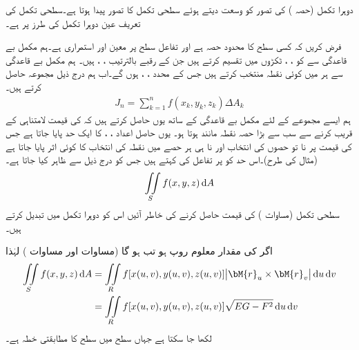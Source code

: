 دوہرا تکمل (حصہ ) کی تصور کو وسعت دیتے ہوئے سطحی تکمل کا تصور پیدا ہوتا ہے۔سطحی تکمل کی تعریف عین دوہرا تکمل کی طرز پر ہے۔

فرض کریں کہ  کسی سطح کا محدود حصہ ہے اور تفاعل  سطح  پر معین اور استمراری ہے۔ہم مکمل بے قاعدگی سے  کو ، ،  ٹکڑوں میں تقسیم کرتے ہیں جن کے  رقبے بالترتیب  ، ،  ہیں۔ ہم مکمل بے قاعدگی سے ہر  میں کوئی نقطہ   منتخب کرتے ہیں جس کے محدد ، ،  ہوں گے۔اب ہم درج ذیل مجموعہ حاصل کرتے ہیں۔
\begin{align}\label{مساوات_خطی_تکمل_سطحی_تکمل_الف}
J_n=\sum_{k=1}^{n}f(x_k,y_k,z_k)\Delta A_k
\end{align}
ہم ایسے مجموعے  کے لئے مکمل بے قاعدگی کے ساتھ یوں حاصل کرتے ہیں کہ  کی قیمت لامتناہی کے قریب کرنے سے سب سے بڑا حصہ  نقطہ مانند ہوتا ہو۔ یوں حاصل اعداد ، ،  کا ایک حد پایا جاتا ہے جس کی قیمت پر نا تو حصوں کی انتخاب اور نا ہی ہر حصے میں نقطہ کی انتخاب کا کوئی اثر پایا جاتا ہے (مثال  کی طرح)۔اس حد کو  پر تفاعل  کی  کہتے ہیں جس کو درج ذیل سے ظاہر کیا جاتا ہے۔
\begin{align}\label{مساوات_خطی_تکمل_سطحی_تکمل_ب}
\iint\limits_S f(x,y,z)\dif A
\end{align}
سطحی تکمل (مساوات ) کی قیمت حاصل کرنے کی خاطر آئیں اس کو دوہرا تکمل میں تبدیل کرتے ہیں۔

اگر  کی مقدار معلوم روپ  ہو تب  ہو گا (مساوات  اور مساوات ) لہٰذا
\begin{gather}
\begin{aligned}\label{مساوات_خطی_تکمل_سطحی_تکمل_بطور_دوہرا_الف}
\iint\limits_S f(x,y,z)\dif A&=\iint\limits_R f[x(u,v),y(u,v),z(u,v)] \abs{\bM{r}_u\times \bM{r}_v}\dif u\dif v\\
&=\iint\limits_R f[x(u,v),y(u,v),z(u,v)] \sqrt{EG-F^2}\dif u\dif v 
\end{aligned}
\end{gather}
لکھا جا سکتا ہے جہاں  سطح میں  سطح  کا مطابقتی خطہ ہے۔ 

